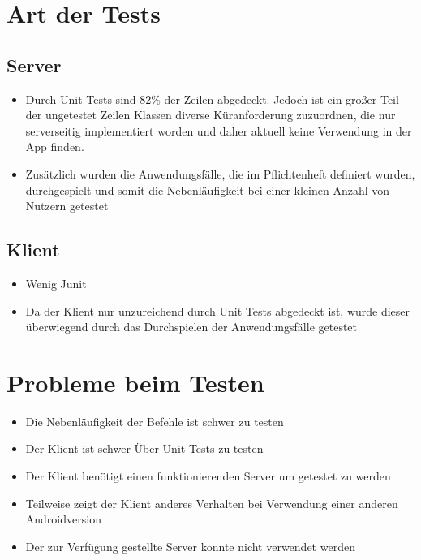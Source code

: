 \documentclass[parskip=full,11pt]{scrartcl}
\begin{document}
\section{Art der Tests}
	\subsection{Server}
		\begin{itemize}
			\item Durch Unit Tests sind 82\% der Zeilen abgedeckt.
						Jedoch ist ein großer Teil der ungetestet Zeilen Klassen
						diverse Küranforderung zuzuordnen, die nur serverseitig
						implementiert worden und daher aktuell keine Verwendung in
						der App finden.
			\item Zusätzlich wurden die Anwendungsfälle, die im Pflichtenheft
						definiert wurden, durchgespielt und somit die Nebenläufigkeit
						bei einer kleinen Anzahl von Nutzern getestet
		\end{itemize}

	\subsection{Klient}
		\begin{itemize}
			\item Wenig Junit %
			\item Da der Klient nur unzureichend durch Unit Tests abgedeckt ist,
						wurde dieser überwiegend durch das Durchspielen der
						Anwendungsfälle getestet
		\end{itemize}

\section{Probleme beim Testen}
	\begin{itemize}
		\item Die Nebenläufigkeit der Befehle ist schwer zu testen
		\item Der Klient ist schwer Über Unit Tests zu testen
		\item Der Klient benötigt einen funktionierenden Server
					um getestet zu werden
		\item Teilweise zeigt der Klient anderes Verhalten bei Verwendung einer
					anderen Androidversion
		\item Der zur Verfügung gestellte Server konnte nicht verwendet werden
	\end{itemize}
\end{document}
